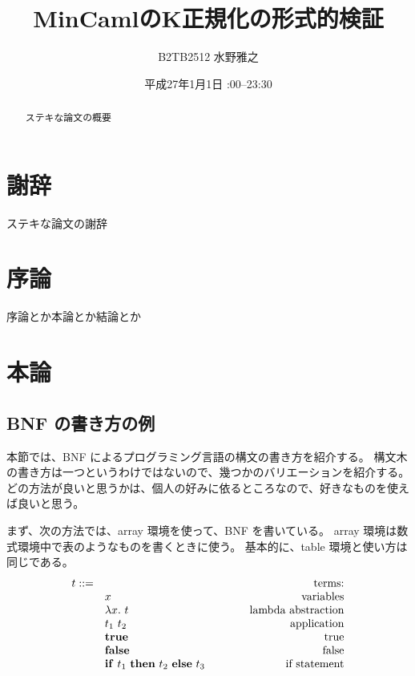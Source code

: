 \documentclass{sumiilab-paper}
\title{MinCamlのK正規化の形式的検証}
\author{B2TB2512 水野雅之}
\institute{東北大学 工学部\\情報知能システム総合学科}%
\date{平成27年1月1日 \quad 23:00--23:30}
\newcommand{\keyword}[1]{\mathbf{#1}}
\newcommand{\TRUE}{\keyword{true}}
\newcommand{\FALSE}{\keyword{false}}
\newcommand{\IF}{\keyword{if}}
\newcommand{\THEN}{\keyword{then}}
\newcommand{\ELSE}{\keyword{else}}
\begin{document}
\maketitle

\begin{abstract}
ステキな論文の概要
\end{abstract}

\chapter*{謝辞}

ステキな論文の謝辞

\tableofcontents


\chapter{序論}

序論とか本論とか結論とか \cite{Pierce:TypeSystems}

\chapter{本論}

\section{BNF の書き方の例}

本節では、BNF によるプログラミング言語の構文の書き方を紹介する。
構文木の書き方は一つというわけではないので、幾つかのバリエーションを紹介する。
どの方法が良いと思うかは、個人の好みに依るところなので、好きなものを使えば良いと思う。

まず、次の方法では、array 環境を使って、BNF を書いている。
array 環境は数式環境中で表のようなものを書くときに使う。
基本的に、table 環境と使い方は同じである。
\[
\begin{array}{rl@{\qquad\qquad}r}
  t ::=
  & & \mbox{terms:} \\
  & x & \mbox{variables} \\
  & \lambda x.~t & \mbox{lambda abstraction} \\
  & t_1~t_2 & \mbox{application} \\
  & \TRUE & \mbox{true} \\
  & \FALSE & \mbox{false} \\
  & \IF~t_1~\THEN~t_2~\ELSE~t_3 & \mbox{if statement}
\end{array}
\]
\end{document}
